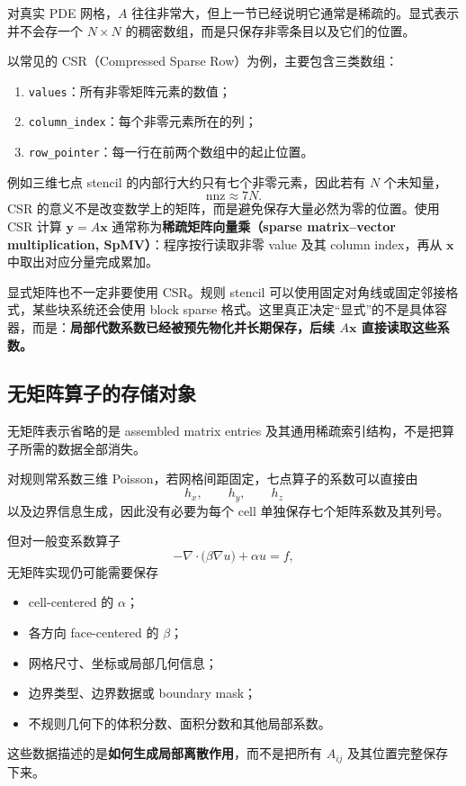 对真实 PDE 网格，$A$ 往往非常大，但上一节已经说明它通常是稀疏的。显式表示并不会存一个 $N\times N$ 的稠密数组，而是只保存非零条目以及它们的位置。

以常见的 CSR（Compressed Sparse Row）为例，主要包含三类数组：
\begin{enumerate}
\item \texttt{values}：所有非零矩阵元素的数值；
\item \texttt{column\_index}：每个非零元素所在的列；
\item \texttt{row\_pointer}：每一行在前两个数组中的起止位置。
\end{enumerate}

例如三维七点 stencil 的内部行大约只有七个非零元素，因此若有 $N$ 个未知量，
\begin{equation}
\mathrm{nnz}\approx7N.
\end{equation}
CSR 的意义不是改变数学上的矩阵，而是避免保存大量必然为零的位置。使用 CSR 计算 $\bm y=A\bm x$ 通常称为\textbf{稀疏矩阵向量乘（sparse matrix--vector multiplication, SpMV）}：程序按行读取非零 value 及其 column index，再从 $\bm x$ 中取出对应分量完成累加。

显式矩阵也不一定非要使用 CSR。规则 stencil 可以使用固定对角线或固定邻接格式，某些块系统还会使用 block sparse 格式。这里真正决定“显式”的不是具体容器，而是：\textbf{局部代数系数已经被预先物化并长期保存，后续 $A\bm x$ 直接读取这些系数。}

\subsection{无矩阵算子的存储对象}

无矩阵表示省略的是 assembled matrix entries 及其通用稀疏索引结构，不是把算子所需的数据全部消失。

对规则常系数三维 Poisson，若网格间距固定，七点算子的系数可以直接由
\begin{equation}
h_x,\qquad h_y,\qquad h_z
\end{equation}
以及边界信息生成，因此没有必要为每个 cell 单独保存七个矩阵系数及其列号。

但对一般变系数算子
\begin{equation}
-\nabla\cdot\bigl(\beta\nabla u\bigr)+\alpha u=f,
\end{equation}
无矩阵实现仍可能需要保存
\begin{itemize}
\item cell-centered 的 $\alpha$；
\item 各方向 face-centered 的 $\beta$；
\item 网格尺寸、坐标或局部几何信息；
\item 边界类型、边界数据或 boundary mask；
\item 不规则几何下的体积分数、面积分数和其他局部系数。
\end{itemize}
这些数据描述的是\textbf{如何生成局部离散作用}，而不是把所有 $A_{ij}$ 及其位置完整保存下来。

